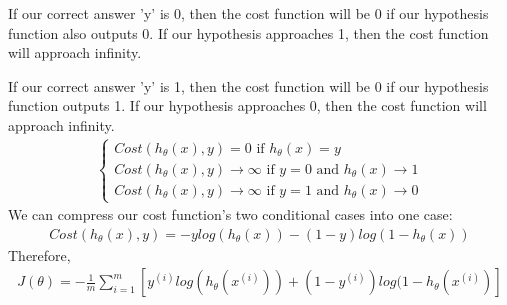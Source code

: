 \documentclass{article}
\begin{document}
            \begin{center}
                \centering
                \qquad
            \end{center}

            If our correct answer 'y' is 0, then the cost function will be 0 if our hypothesis function also outputs 0. 
            If our hypothesis approaches 1, then the cost function will approach infinity.

            If our correct answer 'y' is 1, then the cost function will be 0 if our hypothesis function outputs 1. 
            If our hypothesis approaches 0, then the cost function will approach infinity.
            \begin{align*}
                \begin{cases}
                    Cost(h_{\theta}(x),y) = 0 \text{ if } h_{\theta}(x) = y \\
                    Cost(h_{\theta}(x),y) \longrightarrow \infty \text{ if } y = 0 \text{ and } h_{\theta}(x) \longrightarrow 1 \\
                    Cost(h_{\theta}(x),y) \longrightarrow \infty \text{ if } y = 1 \text{ and } h_{\theta}(x) \longrightarrow 0
                \end{cases}
            \end{align*}
            We can compress our cost function's two conditional cases into one case:
            \begin{align*}
                Cost(h_{\theta}(x),y) = -ylog(h_{\theta}(x)) - (1-y)log(1-h_{\theta}(x))
            \end{align*}
            Therefore,
            \begin{align*}
                J(\theta) = -\frac{1}{m}\sum_{i=1}^{m}[y^{(i)}log(h_{\theta}(x^{(i)})) + (1-y^{(i)})log(1-h_{\theta}(x^{(i)})]
            \end{align*}
\end{document}
